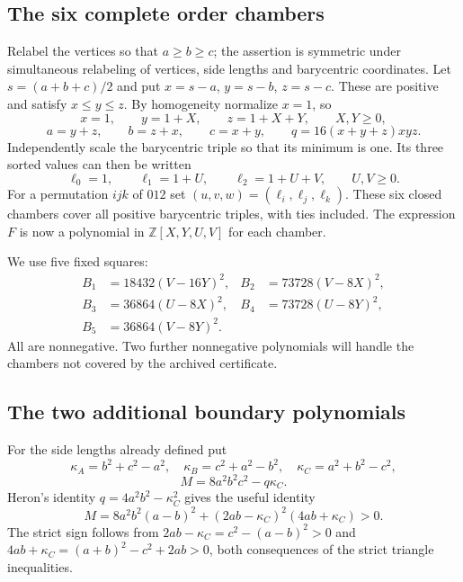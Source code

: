 \documentclass[11pt,a4paper]{article}
\numberwithin{equation}{section}
\theoremstyle{definition}
\theoremstyle{remark}
\begin{document}
\subsection{The six complete order chambers}

Relabel the vertices so that $a\ge b\ge c$; the assertion is
symmetric under simultaneous relabeling of vertices, side lengths and
barycentric coordinates.  Let $s=(a+b+c)/2$ and put
$x=s-a$, $y=s-b$, $z=s-c$.  These are positive and satisfy
$x\le y\le z$.  By homogeneity normalize $x=1$, so
\[
 x=1,\qquad y=1+X,\qquad z=1+X+Y,\qquad X,Y\ge0,
\]
\[
 a=y+z,\qquad b=z+x,\qquad c=x+y,\qquad
 q=16(x+y+z)xyz.
\]
Independently scale the barycentric triple so that its minimum is one.
Its three sorted values can then be written
\[
 \ell_0=1,\qquad\ell_1=1+U,\qquad\ell_2=1+U+V,
 \qquad U,V\ge0.
\]
For a permutation $ijk$ of $012$ set
$(u,v,w)=(\ell_i,\ell_j,\ell_k)$. These six closed chambers cover
all positive barycentric triples, with ties included. The expression
$F$ is now a polynomial in $\mathbb Z[X,Y,U,V]$ for each chamber.

We use five fixed squares:
\begin{align*}
 B_1&=18432(V-16Y)^2,& B_2&=73728(V-8X)^2,\\
 B_3&=36864(U-8X)^2,& B_4&=73728(U-8Y)^2,\\
 B_5&=36864(V-8Y)^2.
\end{align*}
All are nonnegative. Two further nonnegative polynomials will handle
the chambers not covered by the archived certificate.

\subsection{The two additional boundary polynomials}

For the side lengths already defined put
\[
 \kappa_A=b^2+c^2-a^2,\quad
 \kappa_B=c^2+a^2-b^2,\quad
 \kappa_C=a^2+b^2-c^2,
\]
\[
 M=8a^2b^2c^2-q\kappa_C.
\]
Heron's identity $q=4a^2b^2-\kappa_C^2$ gives the useful identity
\begin{equation}\label{add34keio:Mpositive}
 M=8a^2b^2(a-b)^2+(2ab-\kappa_C)^2(4ab+\kappa_C)>0.
\end{equation}
The strict sign follows from
$2ab-\kappa_C=c^2-(a-b)^2>0$ and
$4ab+\kappa_C=(a+b)^2-c^2+2ab>0$, both consequences of the
strict triangle inequalities.
\end{document}
